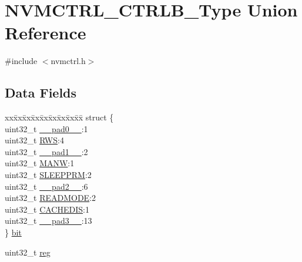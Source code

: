 \hypertarget{union_n_v_m_c_t_r_l___c_t_r_l_b___type}{}\section{N\+V\+M\+C\+T\+R\+L\+\_\+\+C\+T\+R\+L\+B\+\_\+\+Type Union Reference}
\label{union_n_v_m_c_t_r_l___c_t_r_l_b___type}


{\ttfamily \#include $<$nvmctrl.\+h$>$}

\subsection*{Data Fields}
\begin{DoxyCompactItemize}
\item 
\begin{tabbing}
xx\=xx\=xx\=xx\=xx\=xx\=xx\=xx\=xx\=\kill
struct \{\\
\>uint32\_t \mbox{\hyperlink{union_n_v_m_c_t_r_l___c_t_r_l_b___type_a3e57c2ef1c3ffb36722f000cc1156824}{\_\_pad0\_\_}}:1\\
\>uint32\_t \mbox{\hyperlink{union_n_v_m_c_t_r_l___c_t_r_l_b___type_ae44f50b4b530927bd49372b49e2d7a6c}{RWS}}:4\\
\>uint32\_t \mbox{\hyperlink{union_n_v_m_c_t_r_l___c_t_r_l_b___type_a6712ba6dd1d5b43d2d56ff8ac4e275a7}{\_\_pad1\_\_}}:2\\
\>uint32\_t \mbox{\hyperlink{union_n_v_m_c_t_r_l___c_t_r_l_b___type_a51d9ea37b255b1e2d960c22dfc012f6e}{MANW}}:1\\
\>uint32\_t \mbox{\hyperlink{union_n_v_m_c_t_r_l___c_t_r_l_b___type_a40131bb8314257159c8df97f360d0e41}{SLEEPPRM}}:2\\
\>uint32\_t \mbox{\hyperlink{union_n_v_m_c_t_r_l___c_t_r_l_b___type_a9ce12a63de64ef64ae2d59d128251cae}{\_\_pad2\_\_}}:6\\
\>uint32\_t \mbox{\hyperlink{union_n_v_m_c_t_r_l___c_t_r_l_b___type_a1a2d80ba7d3019b15cf3229f59de1b47}{READMODE}}:2\\
\>uint32\_t \mbox{\hyperlink{union_n_v_m_c_t_r_l___c_t_r_l_b___type_a18c82c88ecc019ce9cb5178342c17666}{CACHEDIS}}:1\\
\>uint32\_t \mbox{\hyperlink{union_n_v_m_c_t_r_l___c_t_r_l_b___type_a4854608c0e776f0704a4d9a4b98ea57d}{\_\_pad3\_\_}}:13\\
\} \mbox{\hyperlink{union_n_v_m_c_t_r_l___c_t_r_l_b___type_a72c0d9a8d58dbed7899aacb2ebd7b1b4}{bit}}\\

\end{tabbing}\item 
uint32\+\_\+t \mbox{\hyperlink{union_n_v_m_c_t_r_l___c_t_r_l_b___type_a6b91636401516a477989a336376d7b40}{reg}}
\end{DoxyCompactItemize}


